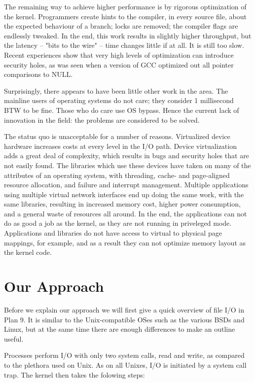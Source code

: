 \documentclass[letterpaper,twocolumn,10pt]{article}
\begin{document}
The remaining way to achieve higher performance is by rigorous optimization of the kernel. Programmers
create hints to the compiler, in every source file, about the expected behaviour of a branch; locks are removed; 
the compiler flags are endlessly tweaked. In the end, this work results in slightly higher throughput, but the 
latency -- "bits to the wire" -- time changes little if at all. It is still too slow. Recent experiences show that 
very high levels  
of optimization can introduce security holes, as was seen when a version of GCC 
optimized out all pointer comparisons to 
NULL. 

Surprisingly, there appears to have been little other work in the area. The mainline users of operating systems do not care; they consider 1 millisecond 
BTW to be fine. Those who do care use OS bypass. Hence the current lack of 
innovation in the field: the problems are considered to be solved. 

The status quo is unacceptable for a number of reasons. Virtualized device hardware increases costs at every level in the I/O path. Device
virtualization 
adds a great deal of complexity, which results in bugs and security holes that are not easily found. The libraries which use these 
devices have taken on many of the attributes of an operating system, with threading, cache- and page-aligned resource allocation, 
and failure and interrupt management. Multiple applications using multiple virtual network interfaces end up doing the same work, with the same
libraries, resulting in increased memory cost, higher power consumption, and a general waste of resources all around. In the end, the applications 
can not do as good a job as the kernel, as they are not running in priveleged mode. Applications and libraries do not have access to
virtual to physical page mappings, for example, and as a result they can not optimize memory layout as the kernel code. 

\section{Our Approach}
Before we explain our approach we will first give a quick overview of file I/O in Plan 9. It is similar to the Unix-compatible OSes such as the various BSDs and Linux, 
but at the same time there are enough differences to make an outline useful. 

Processes perform I/O with only two system calls, read and write, as compared to the plethora used on Unix. As on all Unixes, I/O is initiated by a system call trap. 
The kernel then takes the folowing steps:
\end{document}
